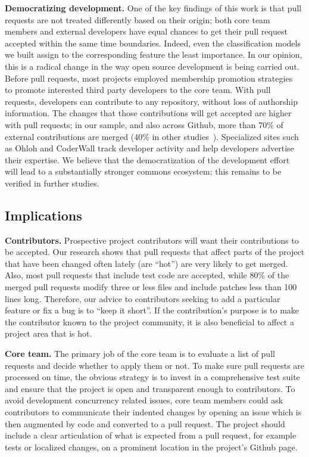\documentclass{sig-alternate}
\begin{document}
%
\textbf{Democratizing development.} One of the key findings of this work is
that pull requests are not treated differently based on their origin; both core
team members and external developers have equal chances to get their pull
request accepted within the same time boundaries. Indeed, even the
classification models we built assign to the corresponding feature the least
importance. In our opinion, this is a radical change in the way open source
development is being carried out. Before pull requests, most projects employed
membership promotion strategies~\cite{Jense07} to promote interested third party
developers to the core team. With pull requests, developers can contribute to
any repository, without loss of authorship information. The changes that those
contributions will get accepted are higher with pull requests; in our sample,
and also across Github, more than 70\% of external contributions are merged
(40\% in other studies~\cite{Rigby06, Weiss08}). Specialized sites such as
Ohloh and CoderWall track developer activity and help developers advertise their
expertise. We believe that the democratization of the development effort will
lead to a substantially stronger commons ecosystem; this remains to be
verified in further studies.


\subsection{Implications}

\textbf{Contributors.} Prospective project contributors will want their
contributions to be accepted. Our research shows that pull requests that affect
parts of the project that  have been changed often lately (are ``hot'') are very
likely to get merged. Also, most pull requests that include test code are
accepted, while 80\% of the merged pull requests modify three or less files and
include patches less than 100 lines long. Therefore, our advice to contributors
seeking to add a particular feature or fix a bug is to ``keep it short''. If the
contribution's purpose is to make the contributor known to the project
community, it is also beneficial to affect a project area that is hot.

\textbf{Core team.} The primary job of the core team is to evaluate a list of
pull requests and decide whether to apply them or not. To make sure pull
requests are processed on time, the obvious strategy is to invest in a
comprehensive test suite and ensure that the project is open and transparent
enough to contributors. To avoid development concurrency related issues, core
team members could ask contributors to communicate their indented changes by
opening an issue which is then augmented by code and converted to a pull
request. The project should include a clear articulation of what is expected
from a pull request, for example tests or localized changes, on a prominent
location in the project's Github page.
\end{document}
